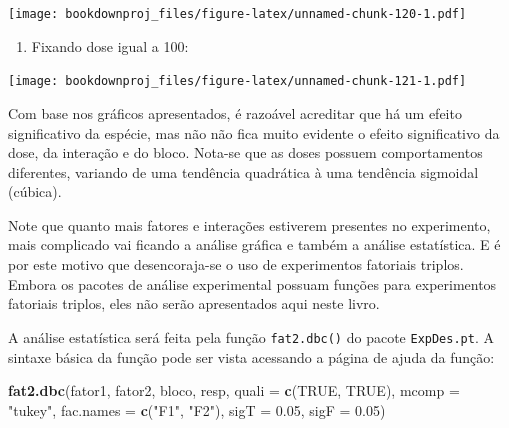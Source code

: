 \documentclass[
]{article}
\newenvironment{Shaded}{\begin{snugshade}}{\end{snugshade}}
\newcommand{\DataTypeTok}[1]{\textcolor[rgb]{0.13,0.29,0.53}{#1}}
\newcommand{\DecValTok}[1]{\textcolor[rgb]{0.00,0.00,0.81}{#1}}
\newcommand{\FloatTok}[1]{\textcolor[rgb]{0.00,0.00,0.81}{#1}}
\newcommand{\KeywordTok}[1]{\textcolor[rgb]{0.13,0.29,0.53}{\textbf{#1}}}
\newcommand{\NormalTok}[1]{#1}
\newcommand{\OperatorTok}[1]{\textcolor[rgb]{0.81,0.36,0.00}{\textbf{#1}}}
\newcommand{\OtherTok}[1]{\textcolor[rgb]{0.56,0.35,0.01}{#1}}
\newcommand{\StringTok}[1]{\textcolor[rgb]{0.31,0.60,0.02}{#1}}
\providecommand{\tightlist}{%
  \setlength{\itemsep}{0pt}\setlength{\parskip}{0pt}}
\begin{document}
\begin{Shaded}
\end{Shaded}

\texttt{[image: bookdownproj\_files/figure-latex/unnamed-chunk-120-1.pdf]}

\begin{enumerate}
\def\labelenumi{\arabic{enumi}.}
\setcounter{enumi}{11}
\tightlist
\item
  Fixando dose igual a 100:
\end{enumerate}

\begin{Shaded}
\end{Shaded}

\texttt{[image: bookdownproj\_files/figure-latex/unnamed-chunk-121-1.pdf]}

Com base nos gráficos apresentados, é razoável acreditar que há um efeito significativo da espécie, mas não não fica muito evidente o efeito significativo da dose, da interação e do bloco. Nota-se que as doses possuem comportamentos diferentes, variando de uma tendência quadrática à uma tendência sigmoidal (cúbica).

Note que quanto mais fatores e interações estiverem presentes no experimento, mais complicado vai ficando a análise gráfica e também a análise estatística. E é por este motivo que desencoraja-se o uso de experimentos fatoriais triplos. Embora os pacotes de análise experimental possuam funções para experimentos fatoriais triplos, eles não serão apresentados aqui neste livro.

A análise estatística será feita pela função \texttt{fat2.dbc()} do pacote \texttt{ExpDes.pt}. A sintaxe básica da função pode ser vista acessando a página de ajuda da função:

\begin{Shaded}
\begin{Highlighting}[]
\KeywordTok{fat2.dbc}\NormalTok{(fator1, fator2, bloco, resp, }\DataTypeTok{quali =} \KeywordTok{c}\NormalTok{(}\OtherTok{TRUE}\NormalTok{, }\OtherTok{TRUE}\NormalTok{), }
         \DataTypeTok{mcomp =} \StringTok{"tukey"}\NormalTok{, }\DataTypeTok{fac.names =} \KeywordTok{c}\NormalTok{(}\StringTok{"F1"}\NormalTok{, }\StringTok{"F2"}\NormalTok{), }
         \DataTypeTok{sigT =} \FloatTok{0.05}\NormalTok{, }\DataTypeTok{sigF =} \FloatTok{0.05}\NormalTok{)}
\end{Highlighting}
\end{Shaded}
\end{document}
